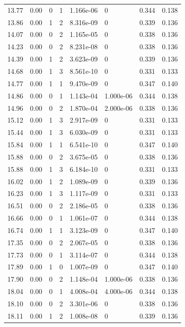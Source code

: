 \documentclass[preview]{standalone}
\begin{document}
{{{\begin{tabular}{L{1.2cm}C{1.2cm} C{0.3cm}C{0.5cm} C{1.4cm}C{1.4cm} C{1.4cm}C{1.4cm}}
  13.77  &  0.00  & 0     &  1 &  1.166e-06  & 0  & 0.344 &  0.138   \\ 
  13.86  &  0.00  & 1     &  2 &  8.316e-09  & 0  & 0.339 &  0.136   \\ 
  14.07  &  0.00  & 0     &  2 &  1.165e-05  & 0  & 0.338 &  0.136   \\ 
  14.23  &  0.00  & 0     &  2 &  8.231e-08  & 0  & 0.338 &  0.136   \\ 
  14.39  &  0.00  & 1     &  2 &  3.623e-09  & 0  & 0.339 &  0.136   \\ 
  14.68  &  0.00  & 1     &  3 &  8.561e-10  & 0  & 0.331 &  0.133   \\ 
  14.77  &  0.00  & 1     &  1 &  9.470e-09  & 0  & 0.347 &  0.140   \\ 
  14.86  &  0.00  & 0     &  1 &  1.143e-04  & 1.000e-06  & 0.344 &  0.138   \\ 
  14.96  &  0.00  & 0     &  2 &  1.870e-04  & 2.000e-06  & 0.338 &  0.136   \\ 
  15.12  &  0.00  & 1     &  3 &  2.917e-09  & 0  & 0.331 &  0.133   \\ 
  15.44  &  0.00  & 1     &  3 &  6.030e-09  & 0  & 0.331 &  0.133   \\ 
  15.84  &  0.00  & 1     &  1 &  6.541e-10  & 0  & 0.347 &  0.140   \\ 
  15.88  &  0.00  & 0     &  2 &  3.675e-05  & 0  & 0.338 &  0.136   \\ 
  15.88  &  0.00  & 1     &  3 &  6.184e-10  & 0  & 0.331 &  0.133   \\ 
  16.02  &  0.00  & 1     &  2 &  1.089e-09  & 0  & 0.339 &  0.136   \\ 
  16.23  &  0.00  & 1     &  3 &  1.117e-09  & 0  & 0.331 &  0.133   \\ 
  16.51  &  0.00  & 0     &  2 &  2.186e-05  & 0  & 0.338 &  0.136   \\ 
  16.66  &  0.00  & 0     &  1 &  1.061e-07  & 0  & 0.344 &  0.138   \\ 
  16.74  &  0.00  & 1     &  1 &  3.123e-09  & 0  & 0.347 &  0.140   \\ 
  17.35  &  0.00  & 0     &  2 &  2.067e-05  & 0  & 0.338 &  0.136   \\ 
  17.73  &  0.00  & 0     &  1 &  3.114e-07  & 0  & 0.344 &  0.138   \\ 
  17.89  &  0.00  & 1     &  0 &  1.007e-09  & 0  & 0.347 &  0.140   \\ 
  17.90  &  0.00  & 0     &  2 &  1.148e-04  & 1.000e-06  & 0.338 &  0.136   \\ 
  18.04  &  0.00  & 0     &  1 &  4.008e-04  & 4.000e-06  & 0.344 &  0.138   \\ 
  18.10  &  0.00  & 0     &  2 &  3.301e-06  & 0  & 0.338 &  0.136   \\ 
  18.11  &  0.00  & 1     &  2 &  1.008e-08  & 0  & 0.339 &  0.136   \\ 
\hline 
\end{tabular} 

}}}
\end{document}
